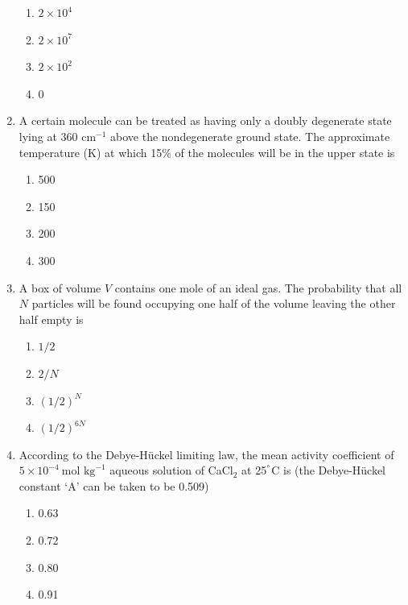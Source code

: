 \documentclass[12pt]{article}
\begin{document}
\begin{enumerate}
\begin{enumerate}
\item $2 \times 10^4$
\item $2 \times 10^7$
\item $2 \times 10^2$
\item 0
\end{enumerate}    \hfill{}




\item A certain molecule can be treated as having only a doubly degenerate state lying at 360 cm$^{-1}$ above the nondegenerate ground state. The approximate temperature (K) at which 15\% of the molecules will be in the upper state is

\begin{enumerate}
\item 500
\item 150
\item 200
\item 300
\end{enumerate}    \hfill{}




\item A box of volume $V$ contains one mole of an ideal gas. The probability that all $N$ particles will be found occupying one half of the volume leaving the other half empty is

\begin{enumerate}
\item $1/2$
\item $2/N$
\item $(1/2)^N$
\item $(1/2)^{6N}$
\end{enumerate}    \hfill{}




\item According to the Debye-Hückel limiting law, the mean activity coefficient of $5 \times 10^{-4}~\text{mol kg}^{-1}$ aqueous solution of CaCl$_2$ at 25$^\degree$C is (the Debye-Hückel constant ‘A’ can be taken to be 0.509)

\begin{enumerate}
\item 0.63
\item 0.72
\item 0.80
\item 0.91
\end{enumerate}    \hfill{}





\end{enumerate}
\end{document}
